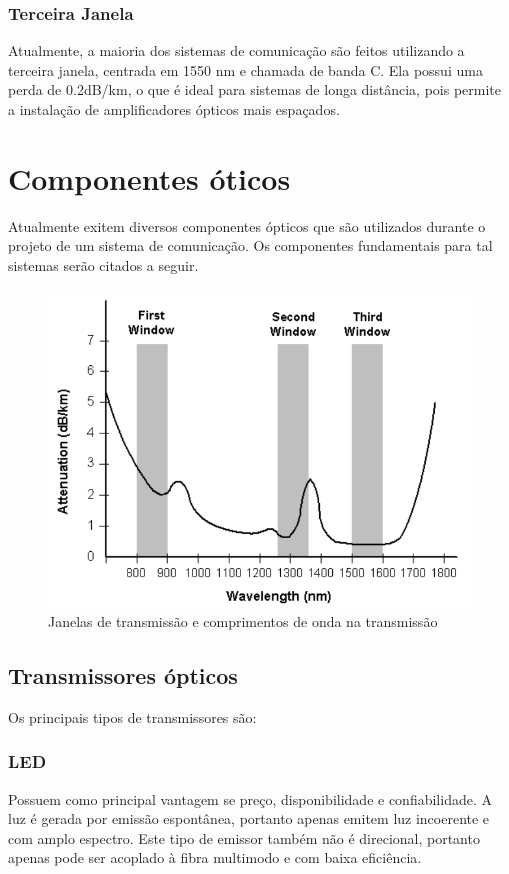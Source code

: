 \documentclass[article]{IEEEtran}
\begin{document}
\subsubsection{Terceira Janela}
Atualmente, a maioria dos sistemas de comunicação são feitos utilizando a terceira janela, centrada em 1550 nm e chamada de banda C. Ela possui uma perda de 0.2dB/km, o que é ideal para sistemas de longa distância, pois permite a instalação de amplificadores ópticos mais espaçados.
\section{Componentes óticos}
Atualmente exitem diversos componentes ópticos que são utilizados durante o projeto de um sistema de comunicação. Os componentes fundamentais para tal sistemas serão citados a seguir.

\begin{figure}[h]
\includegraphics[width=\columnwidth]{windows.png}
\caption{Janelas de transmissão e comprimentos de onda na transmissão}
\end{figure}


\subsection{Transmissores ópticos}
Os principais tipos de transmissores são:
\subsubsection{LED}
Possuem como principal vantagem se preço, disponibilidade e confiabilidade. A luz é gerada por emissão espontânea, portanto apenas emitem luz incoerente e com amplo espectro. Este tipo de emissor também não é direcional, portanto apenas pode ser acoplado à fibra multimodo e com baixa eficiência.\cite{TRANSMITTERS}
\end{document}
